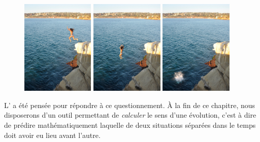 		\begin{figure}
			\begin{center}
				\includegraphics[width=0.31\textwidth]{images/water_jump_1.jpg}
				\includegraphics[width=0.31\textwidth]{images/water_jump_2.jpg}
				\includegraphics[width=0.31\textwidth]{images/water_jump_3.jpg}
			\end{center}
			\label{fig_water_jump}
		\end{figure}
	
		L’ a été pensée pour répondre à ce questionnement. À la fin de ce chapitre, nous disposerons d’un outil permettant de \emph{calculer} le sens d’une évolution, c’est à dire de prédire mathématiquement laquelle de deux situations séparées dans le temps doit avoir eu lieu avant l’autre.

